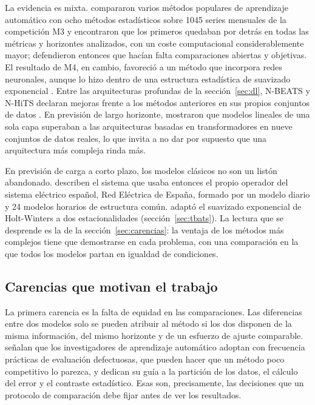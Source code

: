 La evidencia es mixta. \textcite{makridakis2018statistical} compararon varios
métodos populares de aprendizaje automático con ocho métodos estadísticos sobre
1045 series mensuales de la competición M3 y encontraron que los primeros
quedaban por detrás en todas las métricas y horizontes analizados, con un coste
computacional considerablemente mayor; defendieron entonces que hacían falta
comparaciones abiertas y objetivas. El resultado de M4, en cambio, favoreció a
un método que incorpora redes neuronales, aunque lo hizo dentro de una
estructura estadística de suavizado exponencial \parencite{smyl2020hybrid}.
Entre las arquitecturas profundas de la sección~\ref{sec:dl}, N-BEATS y N-HiTS
declaran mejoras frente a los métodos anteriores en sus propios conjuntos de
datos \parencite{oreshkin2020nbeats,challu2023nhits}. En previsión de largo
horizonte, \textcite{zeng2023transformers} mostraron que modelos lineales de una
sola capa superaban a las arquitecturas basadas en transformadores en nueve
conjuntos de datos reales, lo que invita a no dar por supuesto que una
arquitectura más compleja rinda más.

En previsión de carga a corto plazo, los modelos clásicos no son un listón
abandonado. \textcite{cancelo2008forecasting} describen el sistema que usaba
entonces el propio operador del sistema eléctrico español, Red Eléctrica de
España, formado por un modelo diario y 24 modelos horarios de estructura
común. \textcite{taylor2003short} adaptó el suavizado exponencial de Holt-Winters
a dos estacionalidades (sección~\ref{sec:tbats}). La lectura que se desprende
es la de la sección~\ref{sec:carencias}: la ventaja de los métodos más
complejos tiene que demostrarse en cada problema, con una comparación en la que
todos los modelos partan en igualdad de condiciones.

\subsection{Carencias que motivan el trabajo}\label{sec:carencias-literatura}

La primera carencia es la falta de equidad en las comparaciones. Las
diferencias entre dos modelos solo se pueden atribuir al método si los dos
disponen de la misma información, del mismo horizonte y de un esfuerzo de ajuste
comparable. \textcite{hewamalage2023forecast} señalan que los investigadores de
aprendizaje automático adoptan con frecuencia prácticas de evaluación
defectuosas, que pueden hacer que un método poco competitivo lo parezca, y
dedican su guía a la partición de los datos, el cálculo del error y el contraste
estadístico. Esas son, precisamente, las decisiones que un protocolo de
comparación debe fijar antes de ver los resultados.

